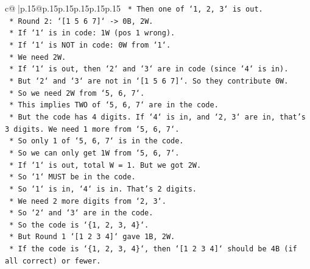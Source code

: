 \documentclass{article}
\begin{document}
{\begin{supertabular}{c@{$\;$}|p{.15\linewidth}@{}p{.15\linewidth}p{.15\linewidth}p{.15\linewidth}p{.15\linewidth}p{.15\linewidth}}
{{{\texttt{                            *   Then one of `1, 2, 3` is out.} \\
\texttt{                            *   Round 2: `{[}1 5 6 7{]}` {-}> 0B, 2W.} \\
\texttt{                                *   If `1` is in code: 1W (pos 1 wrong).} \\
\texttt{                                *   If `1` is NOT in code: 0W from `1`.} \\
\texttt{                                *   We need 2W.} \\
\texttt{                                *   If `1` is out, then `2` and `3` are in code (since `4` is in).} \\
\texttt{                                *   But `2` and `3` are not in `{[}1 5 6 7{]}`. So they contribute 0W.} \\
\texttt{                                *   So we need 2W from `5, 6, 7`.} \\
\texttt{                                *   This implies TWO of `5, 6, 7` are in the code.} \\
\texttt{                                *   But the code has 4 digits. If `4` is in, and `2, 3` are in, that's 3 digits. We need 1 more from `5, 6, 7`.} \\
\texttt{                                *   So only 1 of `5, 6, 7` is in the code.} \\
\texttt{                                *   So we can only get 1W from `5, 6, 7`.} \\
\texttt{                                *   If `1` is out, total W = 1. But we got 2W.} \\
\texttt{                                *   So `1` MUST be in the code.} \\
\texttt{                            *   So `1` is in, `4` is in. That's 2 digits.} \\
\texttt{                            *   We need 2 more digits from `2, 3`.} \\
\texttt{                            *   So `2` and `3` are in the code.} \\
\texttt{                            *   So the code is `\{1, 2, 3, 4\}`.} \\
\texttt{                            *   But Round 1 `{[}1 2 3 4{]}` gave 1B, 2W.} \\
\texttt{                            *   If the code is `\{1, 2, 3, 4\}`, then `{[}1 2 3 4{]}` should be 4B (if all correct) or fewer.} \\
}}}
\end{supertabular}}
\end{document}

